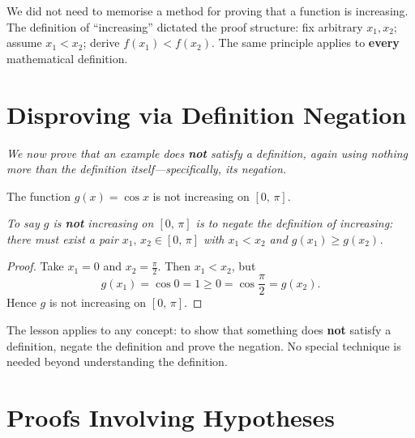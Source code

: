 \begin{remark}
We did not need to memorise a method for proving that a function is increasing.  The definition of ``increasing'' dictated the proof structure: fix arbitrary $x_{1}, x_{2}$; assume $x_{1} < x_{2}$; derive $f(x_{1}) < f(x_{2})$.  The same principle applies to \textbf{every} mathematical definition.
\end{remark}

\section{Disproving via Definition Negation}
\label{sec:1.12}

\textit{We now prove that an example does \textbf{not} satisfy a definition, again using nothing more than the definition itself---specifically, its negation.}

\begin{theorem}
\label{thm:1-10}
The function $g(x) = \cos x$ is not increasing on $[0,\,\pi]$.
\end{theorem}

\textit{To say $g$ is \textbf{not} increasing on $[0,\,\pi]$ is to negate the definition of increasing: there must exist a pair $x_{1},\, x_{2} \in [0,\,\pi]$ with $x_{1} < x_{2}$ and $g(x_{1}) \ge g(x_{2})$.}

\begin{proof}
Take $x_{1} = 0$ and $x_{2} = \frac{\pi}{2}$.  Then $x_{1} < x_{2}$, but
\[
  g(x_{1}) = \cos 0 = 1 \ge 0 = \cos\frac{\pi}{2} = g(x_{2}).
\]
Hence $g$ is not increasing on $[0,\,\pi]$.
\end{proof}

\begin{remark}
The lesson applies to any concept: to show that something does \textbf{not} satisfy a definition, negate the definition and prove the negation.  No special technique is needed beyond understanding the definition.
\end{remark}

\section{Proofs Involving Hypotheses}
\label{sec:1.13}

